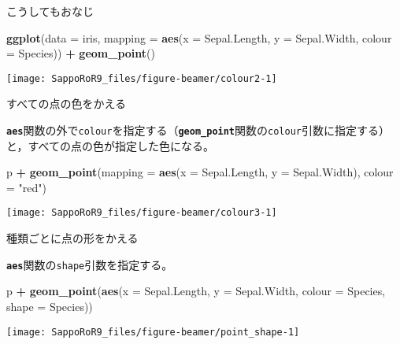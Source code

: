 \documentclass[ignorenonframetext,]{beamer}
\newenvironment{Shaded}{\begin{snugshade}}{\end{snugshade}}
\newcommand{\KeywordTok}[1]{\textcolor[rgb]{0.13,0.29,0.53}{\textbf{#1}}}
\newcommand{\DataTypeTok}[1]{\textcolor[rgb]{0.13,0.29,0.53}{#1}}
\newcommand{\StringTok}[1]{\textcolor[rgb]{0.31,0.60,0.02}{#1}}
\newcommand{\OperatorTok}[1]{\textcolor[rgb]{0.81,0.36,0.00}{\textbf{#1}}}
\newcommand{\NormalTok}[1]{#1}
\let\oldShaded\Shaded
\let\endoldShaded\endShaded
\renewenvironment{Shaded}{\footnotesize\oldShaded}{\endoldShaded}
\begin{document}
\begin{frame}[fragile]{こうしてもおなじ}

\begin{Shaded}
\begin{Highlighting}[]
\KeywordTok{ggplot}\NormalTok{(}\DataTypeTok{data =}\NormalTok{ iris,}
       \DataTypeTok{mapping =} \KeywordTok{aes}\NormalTok{(}\DataTypeTok{x =}\NormalTok{ Sepal.Length, }\DataTypeTok{y =}\NormalTok{ Sepal.Width,}
                     \DataTypeTok{colour =}\NormalTok{ Species)) }\OperatorTok{+}
\StringTok{  }\KeywordTok{geom_point}\NormalTok{()}
\end{Highlighting}
\end{Shaded}

\texttt{[image: SappoRoR9\_files/figure-beamer/colour2-1]}

\end{frame}

\begin{frame}[fragile]{すべての点の色をかえる}

\textbf{\texttt{aes}}関数の外で\texttt{colour}を指定する（\textbf{\texttt{geom\_point}}関数の\texttt{colour}引数に指定する）と，すべての点の色が指定した色になる。

\begin{Shaded}
\begin{Highlighting}[]
\NormalTok{p }\OperatorTok{+}\StringTok{ }\KeywordTok{geom_point}\NormalTok{(}\DataTypeTok{mapping =} \KeywordTok{aes}\NormalTok{(}\DataTypeTok{x =}\NormalTok{ Sepal.Length, }\DataTypeTok{y =}\NormalTok{ Sepal.Width),}
               \DataTypeTok{colour =} \StringTok{"red"}\NormalTok{)}
\end{Highlighting}
\end{Shaded}

\texttt{[image: SappoRoR9\_files/figure-beamer/colour3-1]}

\end{frame}

\begin{frame}[fragile]{種類ごとに点の形をかえる}

\textbf{\texttt{aes}}関数の\texttt{shape}引数を指定する。

\begin{Shaded}
\begin{Highlighting}[]
\NormalTok{p }\OperatorTok{+}\StringTok{ }\KeywordTok{geom_point}\NormalTok{(}\KeywordTok{aes}\NormalTok{(}\DataTypeTok{x =}\NormalTok{ Sepal.Length, }\DataTypeTok{y =}\NormalTok{ Sepal.Width,}
                   \DataTypeTok{colour =}\NormalTok{ Species, }\DataTypeTok{shape =}\NormalTok{ Species))}
\end{Highlighting}
\end{Shaded}

\texttt{[image: SappoRoR9\_files/figure-beamer/point\_shape-1]}

\end{frame}
\end{document}
